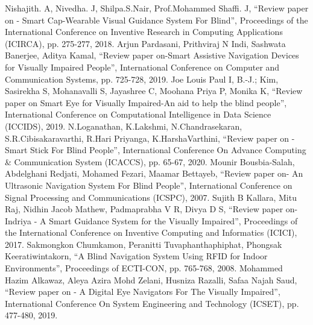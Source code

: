 \documentclass[conference]{IEEEtran}
\begin{document}
\begin{thebibliography}{00}
  Nishajith. A, Nivedha. J, Shilpa.S.Nair, Prof.Mohammed Shaffi. J, “Review paper on - Smart Cap-Wearable Visual Guidance System For Blind”, Proceedings of the International Conference on Inventive Research in Computing Applications (ICIRCA), pp. 275-277, 2018.
  Arjun Pardasani, Prithviraj N Indi, Sashwata Banerjee, Aditya Kamal, “Review paper on-Smart Assistive Navigation Devices for Visually Impaired People”, International Conference on Computer and Communication Systems, pp. 725-728, 2019.
  Joe Louis Paul I, B.-J.; Kim, Sasirekha S, Mohanavalli S, Jayashree C, Moohana Priya P, Monika K, “Review paper on Smart Eye for Visually Impaired-An aid to help the blind people”, International Conference on Computational Intelligence in Data Science (ICCIDS), 2019.
 N.Loganathan, K.Lakshmi, N.Chandrasekaran, S.R.Cibisakaravarthi, R.Hari Priyanga, K.HarshaVarthini, “Review paper on - Smart Stick For Blind People”, International Conference On Advance Computing \& Communication System (ICACCS), pp. 65-67, 2020.
 Mounir Bousbia-Salah, Abdelghani Redjati,  Mohamed Fezari, Maamar Bettayeb, “Review paper on- An Ultrasonic Navigation System For Blind People”, International Conference on Signal Processing and Communications (ICSPC), 2007.
 Sujith B Kallara, Mitu Raj, Nidhin Jacob Mathew, Padmaprabha V R, Divya D S, “Review paper on- Indriya - A Smart Guidance System for the Visually Impaired”, Proceedings of the International Conference on Inventive Computing and Informatics (ICICI), 2017.
 Sakmongkon Chumkamon, Peranitti Tuvaphanthaphiphat, Phongsak Keeratiwintakorn, “A Blind Navigation System Using RFID for Indoor Environments”, Proceedings of ECTI-CON, pp. 765-768, 2008.
 Mohammed Hazim Alkawaz, Aleya Azira Mohd Zelani, Husniza Razalli, Safaa Najah Saud, “Review paper on - A Digital Eye Navigators For The Visually Impaired”, International Conference On System Engineering and Technology (ICSET), pp. 477-480, 2019.
\end{thebibliography}
\end{document}
